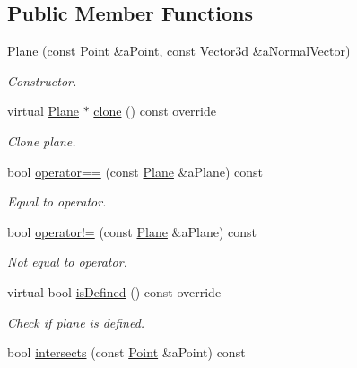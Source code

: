 \subsection*{Public Member Functions}
\begin{DoxyCompactItemize}
\item 
\hyperlink{classostk_1_1math_1_1geom_1_1d3_1_1objects_1_1_plane_ac66c2a3b3d9d7cd1fd507123091bb38f}{Plane} (const \hyperlink{classostk_1_1math_1_1geom_1_1d3_1_1objects_1_1_point}{Point} \&a\+Point, const Vector3d \&a\+Normal\+Vector)
\begin{DoxyCompactList}\small\item\em Constructor. \end{DoxyCompactList}\item 
virtual \hyperlink{classostk_1_1math_1_1geom_1_1d3_1_1objects_1_1_plane}{Plane} $\ast$ \hyperlink{classostk_1_1math_1_1geom_1_1d3_1_1objects_1_1_plane_a9db422bcf962c77b11c1d93325aebfd9}{clone} () const override
\begin{DoxyCompactList}\small\item\em Clone plane. \end{DoxyCompactList}\item 
bool \hyperlink{classostk_1_1math_1_1geom_1_1d3_1_1objects_1_1_plane_a93ba2703f5a835cb55e577d649b462f9}{operator==} (const \hyperlink{classostk_1_1math_1_1geom_1_1d3_1_1objects_1_1_plane}{Plane} \&a\+Plane) const
\begin{DoxyCompactList}\small\item\em Equal to operator. \end{DoxyCompactList}\item 
bool \hyperlink{classostk_1_1math_1_1geom_1_1d3_1_1objects_1_1_plane_a3e2df19f391e163bba7f7be079d19826}{operator!=} (const \hyperlink{classostk_1_1math_1_1geom_1_1d3_1_1objects_1_1_plane}{Plane} \&a\+Plane) const
\begin{DoxyCompactList}\small\item\em Not equal to operator. \end{DoxyCompactList}\item 
virtual bool \hyperlink{classostk_1_1math_1_1geom_1_1d3_1_1objects_1_1_plane_a62401be167d9574a4b20f2a88f7d6c79}{is\+Defined} () const override
\begin{DoxyCompactList}\small\item\em Check if plane is defined. \end{DoxyCompactList}\item 
bool \hyperlink{classostk_1_1math_1_1geom_1_1d3_1_1objects_1_1_plane_aa41d142fb1459952aef497936d351081}{intersects} (const \hyperlink{classostk_1_1math_1_1geom_1_1d3_1_1objects_1_1_point}{Point} \&a\+Point) const

\end{DoxyCompactItemize}
